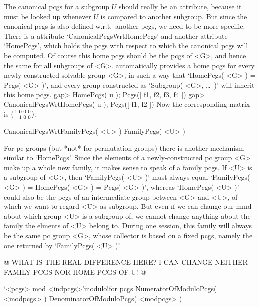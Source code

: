 The  canonical pcgs  for  a subgroup  $U$ should really  be an attribute,
because it  must be looked   up  whenever $U$   is  compared to   another
subgroup. But since  the canonical pcgs  is also  defined w.r.t.\ another
pcgs, we   need to  be  more  specific.   There  is  a  {\GAP}  attribute
`CanonicalPcgsWrtHomePcgs' and  another attribute `HomePcgs', which holds
the pcgs with respect  to which the  canonical pcgs will be computed.  Of
course this home pcgs should be  the pcgs of <G>, and  hence the same for
all subgroups of <G>. {\GAP} automatically provides a home pcgs for every
newly-constructed solvable group <G>, in such a way that `HomePcgs( <G> )
= Pcgs( <G> )', and every group constructed as  `Subgroup( <G>, \dots\ )'
will inherit this home pcgs.
\beginexample
    gap> HomePcgs( u );
    Pcgs([ f1, f2, f3, f4 ])
    gap> CanonicalPcgsWrtHomePcgs( u );
    Pcgs([ f1, f2 ])
\endexample
Now    the corresponding   matrix   is  $({1\atop}   {0\atop1}  {0\atop0}
{0\atop0})$.

\>CanonicalPcgsWrtFamilyPcgs( <U> )
\>FamilyPcgs( <U> )

For  pc   groups (but *not*   for permutation  groups)   there is another
mechanism  similar  to  `HomePcgs'.      Since  the  elements      of   a
newly-constructed pc group <G> make up a whole new family, it makes sense
to speak of a family pcgs. If <U> is a subgroup of <G>, then `FamilyPcgs(
<U> )' must always equal `FamilyPcgs( <G> ) = HomePcgs( <G> ) = Pcgs( <G>
)', whereas `HomePcgs( <U> )'  could also be  the pcgs of an intermediate
group between <G> and  <U>, of which we  want to regard <U>  as subgroup.
But even if  we can change  our mind about which  group <U> is a subgroup
of, we cannot change anything about the family  the elments of <U> belong
to.  During one {\GAP}  session, this family  will always  be the same pc
group  <G>,  whose collector is  based on  a fixed  pcgs,  namely the one
returned by `FamilyPcgs( <U> )'.

@ WHAT IS THE REAL DIFFERENCE HERE? I CAN CHANGE  NEITHER FAMILY PCGS NOR
HOME PCGS OF U! @

\null

\>`<pcgs> mod <indpcgs>'{modulo}!{for pcgs}
\>NumeratorOfModuloPcgs( <modpcgs> )
\>DenominatorOfModuloPcgs( <modpcgs> )

